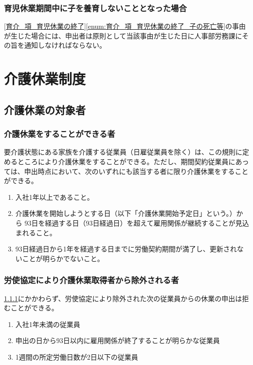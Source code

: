 \documentclass{jsarticle}
\begin{document}
\subsubsection{育児休業期間中に子を養育しないこととなった場合}
\label{育介_項_育児休業期間中に子を養育しないこととなった場合}
\ref{育介_項_育児休業の終了}\ref{enum:育介_項_育児休業の終了_子の死亡等}の事由が生じた場合には、申出者は原則として当該事由が生じた日に人事部労務課にその旨を通知しなければならない。 

\section{介護休業制度}

\subsection{介護休業の対象者}
\label{育介_条_介護休業の対象者}

\subsubsection{介護休業をすることができる者}
\label{育介_項_介護休業をすることができる者}
要介護状態にある家族を介護する従業員（日雇従業員を除く）は、この規則に定めるところにより介護休業をすることができる。ただし、期間契約従業員にあっては、申出時点において、次のいずれにも該当する者に限り介護休業をすることができる。
\begin{enumerate}
  \item 入社1年以上であること。
  \item 介護休業を開始しようとする日（以下「介護休業開始予定日」という。）から 93日を経過する日（93日経過日）を超えて雇用関係が継続することが見込まれること。
  \item 93日経過日から1年を経過する日までに労働契約期間が満了し、更新されないことが明らかでないこと。 
\end{enumerate}

\subsubsection{労使協定により介護休業取得者から除外される者}
\label{育介_項_労使協定により介護休業取得者から除外される者}
\ref{育介_項_介護休業をすることができる者}にかかわらず、労使協定により除外された次の従業員からの休業の申出は拒むことができる。
\begin{enumerate}
  \item 入社1年未満の従業員
  \item 申出の日から93日以内に雇用関係が終了することが明らかな従業員
  \item 1週間の所定労働日数が2日以下の従業員
\end{enumerate}
\end{document}
